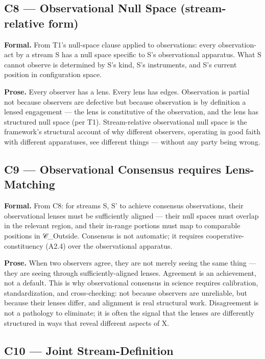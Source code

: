 \documentclass[11pt, openany]{book}
\begin{document}
\subsection{C8 --- Observational Null Space (stream-relative form)}

\textbf{Formal.} From T1's null-space clause applied to observations: every observation-act by a stream S has a null space specific to S's observational apparatus. What S cannot observe is determined by S's kind, S's instruments, and S's current position in configuration space.

\textbf{Prose.} Every observer has a lens. Every lens has edges. Observation is partial not because observers are defective but because observation is by definition a lensed engagement --- the lens is constitutive of the observation, and the lens has structured null space (per T1). Stream-relative observational null space is the framework's structural account of why different observers, operating in good faith with different apparatuses, see different things --- without any party being wrong.

\subsection{C9 --- Observational Consensus requires Lens-Matching}

\textbf{Formal.} From C8: for streams S, S' to achieve consensus observations, their observational lenses must be sufficiently aligned --- their null spaces must overlap in the relevant region, and their in-range portions must map to comparable positions in 𝒞\_\allowbreak{}Outside. Consensus is not automatic; it requires cooperative-constituency (A2.4) over the observational apparatus.

\textbf{Prose.} When two observers agree, they are not merely seeing the same thing --- they are seeing through sufficiently-aligned lenses. Agreement is an achievement, not a default. This is why observational consensus in science requires calibration, standardization, and cross-checking: not because observers are unreliable, but because their lenses differ, and alignment is real structural work. Disagreement is not a pathology to eliminate; it is often the signal that the lenses are differently structured in ways that reveal different aspects of X.

\subsection{C10 --- Joint Stream-Definition}
\end{document}
